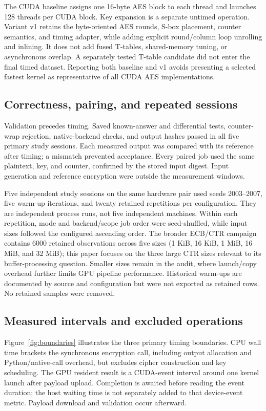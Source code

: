 \documentclass[11pt,a4paper]{article}
\begin{document}
The CUDA baseline assigns one 16-byte AES block to each thread and launches 128 threads per CUDA block. Key expansion is a separate untimed operation. Variant v1 retains the byte-oriented AES rounds, S-box placement, counter semantics, and timing adapter, while adding explicit round/column loop unrolling and inlining. It does not add fused T-tables, shared-memory tuning, or asynchronous overlap. A separately tested T-table candidate did not enter the final timed dataset. Reporting both baseline and v1 avoids presenting a selected fastest kernel as representative of all CUDA AES implementations.

\subsection{Correctness, pairing, and repeated sessions}
Validation precedes timing. Saved known-answer and differential tests, counter-wrap rejection, native-backend checks, and output hashes passed in all five primary study sessions. Each measured output was compared with its reference after timing; a mismatch prevented acceptance. Every paired job used the same plaintext, key, and counter, confirmed by the stored input digest. Input generation and reference encryption were outside the measurement windows.

Five independent study sessions on the same hardware pair used seeds 2003--2007, five warm-up iterations, and twenty retained repetitions per configuration. They are independent process runs, not five independent machines. Within each repetition, mode and backend/scope job order were seed-shuffled, while input sizes followed the configured ascending order. The broader ECB/CTR campaign contains 6000 retained observations across five sizes (1 KiB, 16 KiB, 1 MiB, 16 MiB, and 32 MiB); this paper focuses on the three large CTR sizes relevant to its buffer-processing question. Smaller sizes remain in the audit, where launch/copy overhead further limits GPU pipeline performance. Historical warm-ups are documented by source and configuration but were not exported as retained rows. No retained samples were removed.

\subsection{Measured intervals and excluded operations}
Figure~\ref{fig:boundaries} illustrates the three primary timing boundaries. CPU wall time brackets the synchronous encryption call, including output allocation and Python/native-call overhead, but excludes cipher construction and key scheduling. The GPU resident result is a CUDA-event interval around one kernel launch after payload upload. Completion is awaited before reading the event duration; the host waiting time is not separately added to that device-event metric. Payload download and validation occur afterward.
\end{document}
